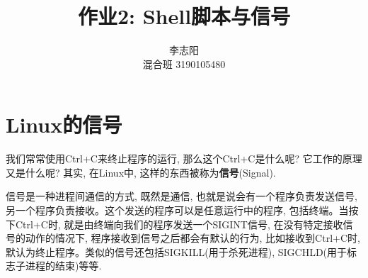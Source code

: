 \documentclass[a4paper]{ctexart}
\title{作业2: Shell脚本与信号}
\author{李志阳 \\ 混合班 3190105480}
\begin{document}
\maketitle

\section{Linux的信号}

我们常常使用Ctrl+C来终止程序的运行, 那么这个Ctrl+C是什么呢? 它工作的原理又是什么呢? 其实,  在Linux中, 这样的东西被称为\textbf{信号}(Signal).

信号是一种进程间通信的方式, 既然是通信, 也就是说会有一个程序负责发送信号,  另一个程序负责接收。这个发送的程序可以是任意运行中的程序, 包括终端。当按下Ctrl+C时,  就是由终端向我们的程序发送一个SIGINT信号, 在没有特定接收信号的动作的情况下,  程序接收到信号之后都会有默认的行为, 比如接收到Ctrl+C时,  默认为终止程序。类似的信号还包括SIGKILL(用于杀死进程), SIGCHLD(用于标志子进程的结束)等等.
\end{document}
